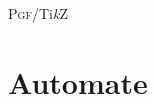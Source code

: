 \documentclass[a4paper]{article}
\newcommand{\pgflogo}{\textsc{Pgf}}
\newcommand{\tikzlogo}{Ti\emph{k}Z}
\newcommand{\pgftikz}{\pgflogo\slash\tikzlogo}
\begin{document}
 

\begin{center}
  {\LARGE \pgftikz}
\end{center}

\newpage 
\section{Automate}



\end{document}
